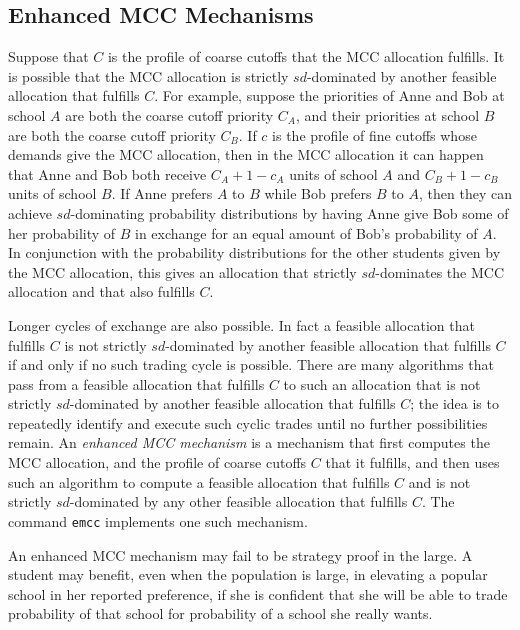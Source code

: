 \documentclass[12pt]{article}
\theoremstyle{definition}
\begin{document}
\subsection{Enhanced MCC Mechanisms}

Suppose that $C$ is the profile of coarse cutoffs that the MCC
allocation fulfills.  It is possible that the MCC allocation is
strictly $sd$-dominated by another feasible allocation that fulfills
$C$.  For example, suppose the priorities of Anne and Bob at school
$A$ are both the coarse cutoff priority $C_A$, and their priorities at
school $B$ are both the coarse cutoff priority $C_B$.  If $c$ is the
profile of fine cutoffs whose demands give the MCC allocation, then in
the MCC allocation it can happen that Anne and Bob both receive $C_A +
1 - c_A$ units of school $A$ and $C_B + 1 - c_B$ units of school $B$.
If Anne prefers $A$ to $B$ while Bob prefers $B$ to $A$, then they can
achieve $sd$-dominating probability distributions by having Anne give
Bob some of her probability of $B$ in exchange for an equal amount of
Bob's probability of $A$.  In conjunction with the probability
distributions for the other students given by the MCC allocation, this
gives an allocation that strictly $sd$-dominates the MCC allocation
and that also fulfills $C$.

Longer cycles of exchange are also possible.  In fact a feasible
allocation that fulfills $C$ is not strictly $sd$-dominated by another
feasible allocation that fulfills $C$ if and only if no such trading
cycle is possible.  There are many algorithms that pass from a
feasible allocation that fulfills $C$ to such an allocation that is
not strictly $sd$-dominated by another feasible allocation that
fulfills $C$; the idea is to repeatedly identify and execute such
cyclic trades until no further possibilities remain.  An
\emph{enhanced MCC mechanism} is a mechanism that first computes the
MCC allocation, and the profile of coarse cutoffs $C$ that it
fulfills, and then uses such an algorithm to compute a feasible
allocation that fulfills $C$ and is not strictly $sd$-dominated by any
other feasible allocation that fulfills $C$.  The command
\texttt{emcc} implements one such mechanism.

An enhanced MCC mechanism may fail to be strategy proof in the large.
A student may benefit, even when the population is large, in elevating
a popular school in her reported preference, if she is confident that
she will be able to trade probability of that school for probability
of a school she really wants.
\end{document}

